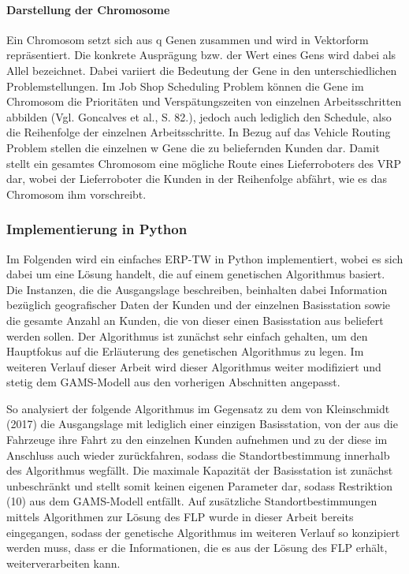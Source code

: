 \documentclass[a4paper,12pt,parskip,bibtotoc,liststotoc]{article}
\begin{document}
\paragraph{Darstellung der Chromosome}

Ein Chromosom setzt sich aus q Genen zusammen und wird in Vektorform repräsentiert. 
Die konkrete Ausprägung bzw. der Wert eines Gens wird dabei als Allel bezeichnet.
Dabei variiert die Bedeutung der Gene in den unterschiedlichen Problemstellungen. 
Im Job Shop Scheduling Problem können die Gene im Chromosom die Prioritäten und Verspätungszeiten von einzelnen Arbeitsschritten abbilden (Vgl. Goncalves et al., S. 82.), jedoch auch lediglich den Schedule, also die Reihenfolge der einzelnen Arbeitsschritte.
In Bezug auf das Vehicle Routing Problem stellen die einzelnen w Gene die zu beliefernden Kunden dar. 
Damit stellt ein gesamtes Chromosom eine mögliche Route eines Lieferroboters des VRP dar, wobei der Lieferroboter die Kunden in der Reihenfolge abfährt, wie es das Chromosom ihm vorschreibt. 


\subsubsection{Implementierung in Python}

Im Folgenden wird ein einfaches ERP-TW in Python implementiert, wobei es sich dabei um eine Lösung handelt, die auf einem genetischen Algorithmus basiert. 
Die Instanzen, die die Ausgangslage beschreiben, beinhalten dabei Information bezüglich geografischer Daten der Kunden und der einzelnen Basisstation sowie die gesamte Anzahl an Kunden, die von dieser einen Basisstation aus beliefert werden sollen.
Der Algorithmus ist zunächst sehr einfach gehalten, um den Hauptfokus auf die Erläuterung des genetischen Algorithmus zu legen. 
Im weiteren Verlauf dieser Arbeit wird dieser Algorithmus weiter modifiziert und stetig dem GAMS-Modell aus den vorherigen Abschnitten angepasst.

So analysiert der folgende Algorithmus im Gegensatz zu dem von Kleinschmidt (2017) die Ausgangslage mit lediglich einer einzigen Basisstation, von der aus die Fahrzeuge ihre Fahrt zu den einzelnen Kunden aufnehmen und zu der diese im Anschluss auch wieder zurückfahren, sodass die Standortbestimmung innerhalb des Algorithmus wegfällt.
Die maximale Kapazität der Basisstation ist zunächst unbeschränkt und stellt somit keinen eigenen Parameter dar, sodass Restriktion (10) aus dem GAMS-Modell entfällt. 
Auf zusätzliche Standortbestimmungen mittels Algorithmen zur Lösung des FLP wurde in dieser Arbeit bereits eingegangen, sodass der genetische Algorithmus im weiteren Verlauf so konzipiert werden muss, dass er die Informationen, die es aus der Lösung des FLP erhält, weiterverarbeiten kann.
\end{document}
